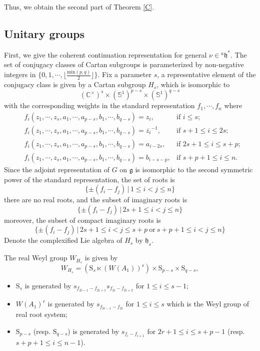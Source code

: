\documentclass[12pt, a4paper]{amsart}
\numberwithin{equation}{section}
\newcommand{\BC}{{\mathbb {C}}}
\newcommand{\BS}{{\mathbb {S}}}
\newcommand{\fg}{\mathfrak{g}}
\newcommand{\fh}{\mathfrak{h}}
\newcommand{\set}[2]{\{#1\,|\,#2\}}
\renewcommand{\bar}{\overline}
\begin{document}
Thus, we obtain the second part of Theorem \ref{C}.





\subsection{Unitary groups}

First, we give the coherent continuation representation for general $\nu \in {^{a}\fh^*}$. The set of conjugacy classes of Cartan subgroups is parameterized by non-negative integers in $\{0,1,\cdots,\lfloor\frac{\mathrm{min}(p,q)}{2}\rfloor\}$. Fix a parameter $s$, a representative element of the conjugacy class is given by a Cartan subgroup $H_s$, which is isomorphic to 
$$(\BC^{\times})^s \times (\BS^1)^{p-s} \times (\BS^1)^{q-s}$$
with the corresponding weights in the standard representation $f_1,\cdots,f_n$ where
\begin{align}
    & f_{i}(z_1,\cdots,z_s,a_1,\cdots,a_{p-s},b_1,\cdots,b_{q-s}) = z_i, & \textrm{if $i \leq s$};\\
    & f_{i}(z_1,\cdots,z_s,a_1,\cdots,a_{p-s},b_1,\cdots,b_{q-s}) = \bar{z_i}^{-1}, & \textrm{if $s+1 \leq i \leq 2s$};\\
    &f_i(z_1,\cdots,z_s,a_1,\cdots,a_{p-s},b_1,\cdots,b_{q-s}) = a_{i-2s}, & \textrm{if $2s+1 \leq i \leq s+p$};\\
    &f_i(z_1,\cdots,z_s,a_1,\cdots,a_{p-s},b_1,\cdots,b_{q-s}) = b_{i-s-p}, & \textrm{if $s+p+1 \leq i \leq n$}.
\end{align}
Since the adjoint representation of $G$ on $\fg$ is isomorphic to the second symmetric power of the standard representation, the set of roots is 
$$\set{\pm(f_i-f_j)}{1\leq i <j \leq n}$$
there are no real roots, and the subset of imaginary roots is
$$\set{\pm(f_i-f_j)}{2s+1 \leq i < j \leq n}$$
moreover, the subset of compact imaginary roots is
$$\set{\pm(f_i-f_j)}{2s+1 \leq i < j \leq s+p \  \textrm{or} \ s+p+1 \leq i<j \leq n }$$
Denote the complexified Lie algebra of $H_s$ by $\fh_s$. 

The real Weyl group $W_{H_s}$ is given by
$$W_{H_s} = (\mathrm{S}_s \ltimes  (W(A_1))^s) \times \mathrm{S}_{p-s} \times \mathrm{S}_{q-s},$$

\begin{itemize}
    \item $\mathrm{S}_s$ is generated by $s_{f_{2i-1}-f_{2i+1}}s_{f_{2i}-f_{2i+2}}$ for $1 \leq i \leq s-1$;
    \item $W(A_1)^r$ is generated by $s_{f_{2i-1}-f_{2i}}$ for $1 \leq i \leq s$ which is the Weyl group of real root system;
    \item $\mathrm{S}_{p-s}$ (resp. $\mathrm{S}_{q-s}$) is generated by $s_{f_{i}-f_{i+1}}$ for $2r+1 \leq i \leq s+p-1$ (resp. $s+p+1 \leq i \leq n-1$).
\end{itemize}
\end{document}
